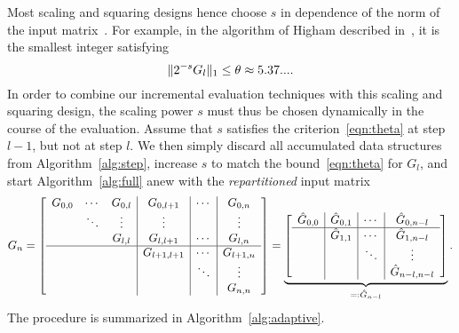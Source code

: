 Most scaling and squaring designs hence choose $s$ in dependence of the
norm of the input matrix~\cite{Moler2003,Guttel2016,Higham2009}.  For
example, in the algorithm of Higham described in~\cite{Higham2009}, it
is the smallest integer satisfying
\begin{equation}
    \label{eqn:theta}
    \lVert 2^{-s} G_l \rVert_1 \le \theta \approx 5.37... .
\end{equation}
In order to combine our incremental evaluation techniques with this
scaling and squaring design, the scaling power $s$ must thus be chosen
dynamically in the course of the evaluation.  Assume that $s$
satisfies the criterion~\eqref{eqn:theta} at step $l-1$, but not at step
$l$.  We then simply discard all accumulated data structures from
Algorithm~\ref{alg:step}, increase $s$ to match the
bound~\eqref{eqn:theta} for $G_{l}$, and start
Algorithm~\ref{alg:full} anew with the \emph{repartitioned} input matrix
\begin{equation}
    \label{eqn:repart}
G_n = \left[
    \begin{array}{ccc|c|c|c}
        G_{0,0} &  \cdots &G_{0,l}  & G_{0,l+1}  & \cdots & G_{0,n}\\
                &  \ddots & \vdots  & \vdots     &        & \vdots\\ 
                &         & G_{l,l} & G_{l,l+1}  & \cdots & G_{l,n}\\ \hline
                &         &         & G_{l+1,l+1}& \cdots & G_{l+1,n}\\
                &         &         &            & \ddots & \vdots   \\
                &         &         &            &        & G_{n,n}  \\
    \end{array}
\right]
    =
    \underbrace{
\left[
    \begin{array}{c|c|c|c}
        \hat{G}_{0,0} & \hat{G}_{0,1}    & \cdots & \hat{G}_{0,n-l}\\ \hline
                      & \hat{G}_{1,1}    & \cdots & \hat{G}_{1,n-l}\\
                      &                  & \ddots & \vdots   \\
                      &                  &        & \hat{G}_{n-l,n-l}  \\
    \end{array}
\right]}_{=\mathrel{\mathop:} \hat{G}_{n-l}}.
\end{equation}
The procedure is summarized in Algorithm~\ref{alg:adaptive}.


